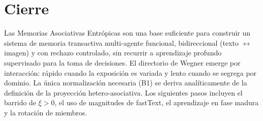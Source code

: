 \documentclass[11pt]{article}
\begin{document}
\section{Cierre}

Las Memorias Asociativas Entrópicas son una base suficiente para construir un
sistema de memoria transactiva multi-agente funcional, bidireccional
(texto $\leftrightarrow$ imagen) y con rechazo controlado, sin recurrir a
aprendizaje profundo supervisado para la toma de decisiones.
El directorio de Wegner emerge por interacción: rápido cuando la exposición
es variada y lento cuando se segrega por dominio. La única normalización
necesaria (B1) se deriva analíticamente de la definición de la proyección
hetero-asociativa.
Los siguientes pasos incluyen el barrido de $\xi > 0$, el uso de magnitudes de
fastText, el aprendizaje en fase madura y la rotación de miembros.



\end{document}
